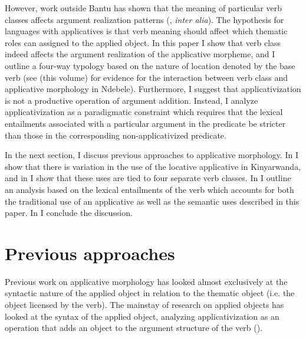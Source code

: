 \documentclass[output=paper]{langsci/langscibook}
\begin{document}
 However, work outside Bantu has shown that the meaning of particular verb classes affects argument realization patterns (\citealt{fillmore:1970,levin:1993,lrh:2008a,beavers:2011a}, \emph{inter alia}). The hypothesis for languages with applicatives is that verb meaning should affect which thematic roles can assigned to the applied object. In this paper I show that verb class indeed affects the argument realization of the applicative morpheme, and I outline a four-way typology based on the nature of location denoted by the base verb (see \citealt{sibanda:2016} (this volume) for evidence for the interaction between verb class and applicative morphology in Ndebele). Furthermore, I suggest that applicativization is not a productive operation of argument addition. Instead, I analyze applicativization as a paradigmatic constraint which requires that the lexical entailments associated with a particular argument in the predicate be stricter than those in the corresponding non-applicativized predicate.
 
 
In the next section, I discuss previous approaches to applicative morphology. In  I show that there is variation in the use of the locative applicative in Kinyarwanda, and in  I show that these uses are tied to four separate verb classes. In  I outline an analysis based on the lexical entailments of the verb which accounts for both the traditional use of an applicative as well as the semantic uses described in this paper. In  I conclude the discussion.
	 
 

\section{Previous approaches}\label{sec:jerro:2} %
 

 Previous work on applicative morphology has looked almost exclusively at the syntactic nature of the applied object in relation to the thematic object (i.e. the object licensed by the verb). The mainstay of research on applied objects has looked at the syntax of the applied object, analyzing applicativization as an operation that adds an object to the argument structure of the verb (\citealt{baker:1988,bresnan:1990,alsina:1992,AlsinaMchombo1993,marantz:1993,pylkkanen:2008, mcginnis:2001,mcginnis:2003,baker:2006,zeller:2006,zellerngoboka:2006,peterson:2007, jeong:2007,bakeretal:2012,jerro:2015}).  
  
\end{document}
